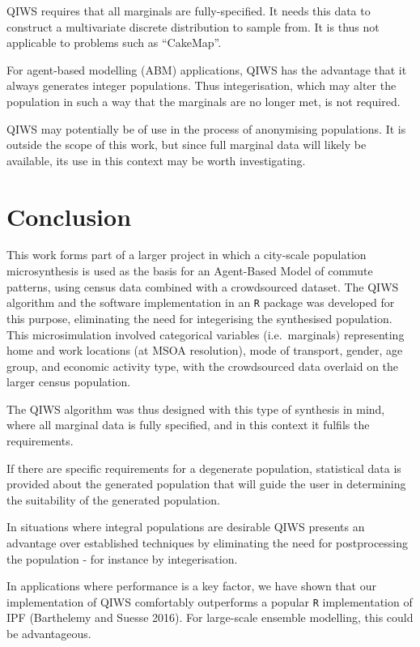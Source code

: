 \documentclass[]{article}
\begin{document}
QIWS requires that all marginals are fully-specified. It needs this data
to construct a multivariate discrete distribution to sample from. It is
thus not applicable to problems such as ``CakeMap''.

For agent-based modelling (ABM) applications, QIWS has the advantage
that it always generates integer populations. Thus integerisation, which
may alter the population in such a way that the marginals are no longer
met, is not required.

QIWS may potentially be of use in the process of anonymising
populations. It is outside the scope of this work, but since full
marginal data will likely be available, its use in this context may be
worth investigating.

\section{Conclusion}\label{conclusion}

This work forms part of a larger project in which a city-scale
population microsynthesis is used as the basis for an Agent-Based Model
of commute patterns, using census data combined with a crowdsourced
dataset. The QIWS algorithm and the software implementation in an
\texttt{R} package was developed for this purpose, eliminating the need
for integerising the synthesised population. This microsimulation
involved categorical variables (i.e.~marginals) representing home and
work locations (at MSOA resolution), mode of transport, gender, age
group, and economic activity type, with the crowdsourced data overlaid
on the larger census population.

The QIWS algorithm was thus designed with this type of synthesis in
mind, where all marginal data is fully specified, and in this context it
fulfils the requirements.

If there are specific requirements for a degenerate population,
statistical data is provided about the generated population that will
guide the user in determining the suitability of the generated
population.

In situations where integral populations are desirable QIWS presents an
advantage over established techniques by eliminating the need for
postprocessing the population - for instance by integerisation.

In applications where performance is a key factor, we have shown that
our implementation of QIWS comfortably outperforms a popular \texttt{R}
implementation of IPF (Barthelemy and Suesse 2016). For large-scale
ensemble modelling, this could be advantageous.
\end{document}
